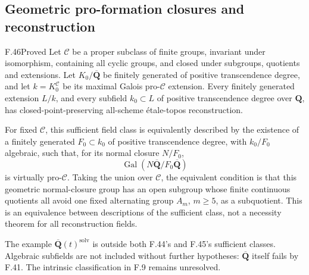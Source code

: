 \subsection{Geometric pro-formation closures and reconstruction}

\begin{claim}{F.46}{Proved}\label{clm:F46}
Let $\mathcal C$ be a proper subclass of finite groups, invariant under
isomorphism, containing all cyclic groups, and closed under subgroups,
quotients and extensions. Let $K_0/\overline{\mathbf Q}$ be finitely
generated of positive transcendence degree, and let
$k=K_0^{\mathcal C}$ be its maximal Galois pro-$\mathcal C$ extension.
Every finitely generated extension $L/k$, and every subfield
$k_0\subset L$ of positive transcendence degree over $\mathbf Q$,
has closed-point-preserving all-scheme \'etale-topos reconstruction.

For fixed $\mathcal C$, this sufficient field class is equivalently
described by the existence of a finitely generated
$F_0\subset k_0$ of positive transcendence degree, with $k_0/F_0$
algebraic, such that, for its normal closure $N/F_0$,
\[
 \operatorname{Gal}(N\overline{\mathbf Q}/F_0\overline{\mathbf Q})
\]
is virtually pro-$\mathcal C$. Taking the union over $\mathcal C$,
the equivalent condition is that this geometric normal-closure group
has an open subgroup whose finite continuous quotients all avoid one
fixed alternating group $A_m$, $m\ge5$, as a subquotient.
This is an equivalence between descriptions of the sufficient class,
not a necessity theorem for all reconstruction fields.

The example $\overline{\mathbf Q}(t)^{\mathrm{solv}}$ is outside
both F.44's and F.45's sufficient classes. Algebraic subfields are not
included without further hypotheses: $\overline{\mathbf Q}$ itself
fails by F.41. The intrinsic classification in F.9 remains unresolved.
\end{claim}
